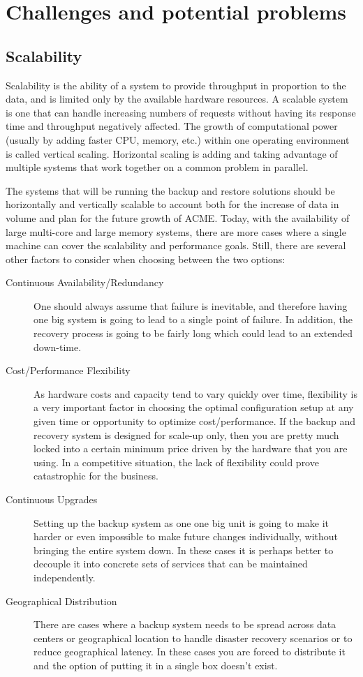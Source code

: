 ﻿\section{Challenges and potential problems}

\subsection{Scalability}
Scalability is the ability of a system to provide throughput in
proportion to the data, and is limited only by the available hardware
resources. A scalable system is one that can handle increasing numbers
of requests without having its response time and throughput negatively
affected. The growth of computational power (usually by adding faster
CPU, memory, etc.) within one operating environment is called vertical
scaling. Horizontal scaling is adding and taking advantage of multiple
systems that work together on a common problem in parallel. %

The systems that will be running the backup and restore solutions should
be horizontally and vertically scalable to account both for the increase
of data in volume and plan for the future growth of ACME. Today, with
the availability of large multi-core and large memory systems, there are
more cases where a single machine can cover the scalability and
performance goals. Still, there are several other factors to consider
when choosing between the two options:

\begin{description}
	\item[Continuous Availability/Redundancy] One should always assume
		that failure is inevitable, and therefore having one big system
		is going to lead to a single point of failure. In addition, the
		recovery process is going to be fairly long which could lead to
		an extended down-time.
	\item[Cost/Performance Flexibility] As hardware costs and capacity tend
		to vary quickly over time, flexibility is a very important factor in
		choosing the optimal configuration setup at any given time or
		opportunity to optimize cost/performance. If the backup and recovery
		system is designed for scale-up only, then you are pretty much
		locked into a certain minimum price driven by the hardware that you
		are using. In a competitive situation, the lack of flexibility could
		prove catastrophic for the business.
	\item[Continuous Upgrades] Setting up the backup system as one one
		big unit is going to make it harder or even impossible to make
		future changes individually, without bringing the entire system
		down. In these cases it is perhaps better to decouple it into
		concrete sets of services that can be maintained independently.
	\item[Geographical Distribution] There are cases where a backup
		system needs to be spread across data centers or geographical
		location to handle disaster recovery scenarios or to reduce
		geographical latency. In these cases you are forced to
		distribute it and the option of putting it in a single box
		doesn't exist.
\end{description}


